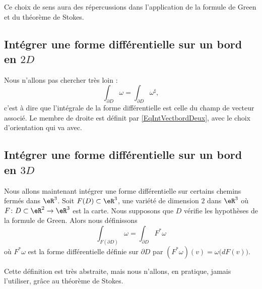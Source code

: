 Ce choix de sens aura des répercussions dans l'application de la formule de Green et du théorème de Stokes.

\subsection{Intégrer une forme différentielle sur un bord en \texorpdfstring{$ 2D$}{2D}}

Nous n'allons pas chercher très loin :
\begin{equation}
	\int_{\partial D}\omega=\int_{\partial D}\omega^{\sharp},
\end{equation}
c'est à dire que l'intégrale de la forme différentielle est celle du champ de vecteur associé. Le membre de droite est définit par \eqref{EqIntVectbordDeux}, avec le choix d'orientation qui va avec.

\subsection{Intégrer une forme différentielle sur un bord en \texorpdfstring{$ 3D$}{3D}}

Nous allons maintenant intégrer une forme différentielle sur certains chemins fermés dans $\eR^3$. Soit $F(D)\subset\eR^3$, une variété de dimension $2$ dans $\eR^3$ où $F\colon D\subset\eR^2\to \eR^3$ est la carte. Nous supposons que $D$ vérifie les hypothèses de la formule de Green. Alors nous définissons
\begin{equation}		\label{EqDefIntTroisForBord}
	\int_{F(\partial D)}\omega = \int_{\partial D} F^*\omega
\end{equation}
où $F^*\omega$ est la forme différentielle définie sur $\partial D$ par $(F^*\omega)(v)=\omega\big( dF(v) \big)$.

Cette définition est très abstraite, mais nous n'allons, en pratique, jamais l'utiliser, grâce au théorème de Stokes.

